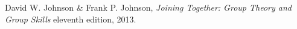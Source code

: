 \begin{thebibliography}{99}	%
		David W. Johnson \& Frank P. Johnson,
		\emph{Joining Together: Group Theory and Group Skills}
		eleventh edition,
		2013.
\end{thebibliography}